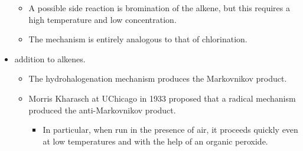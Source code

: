 \documentclass[../notes.tex]{subfiles}
\begin{document}
\begin{itemize}
    \begin{itemize}
        \item A possible side reaction is bromination of the alkene, but this requires a high temperature and low concentration.
        \item The mechanism is entirely analogous to that of chlorination.
    \end{itemize}
    \item {} addition to alkenes.
    \begin{itemize}
        \item The hydrohalogenation mechanism produces the Markovnikov product.
        \item Morris Kharasch at UChicago in 1933 proposed that a radical mechanism produced the anti-Markovnikov product.
        \begin{itemize}
            \item In particular, when run in the presence of air, it proceeds quickly even at low temperatures and with the help of an organic peroxide.
        \end{itemize}
    \end{itemize}

\end{itemize}
\end{document}
